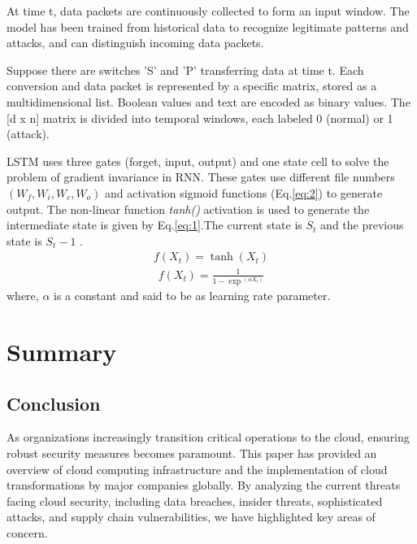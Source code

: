 \documentclass{ijitcs}
\begin{document}
At time t, data packets are continuously collected to form an input window. The model has been trained from historical data to recognize legitimate patterns and attacks, and can distinguish incoming data packets.

Suppose there are switches 'S' and 'P' transferring data at time t. Each conversion and data packet is represented by a specific matrix, stored as a multidimensional list. Boolean values and text are encoded as binary values. The [d x n] matrix is divided into temporal windows, each labeled 0 (normal) or 1 (attack)\cite{priyadarshini2022deep}.

LSTM uses three gates (forget, input, output) and one state cell to solve the problem of gradient invariance in RNN. These gates use different file numbers $(W_f, W_i, W_c, W_o)$ and activation sigmoid functions (Eq.\ref{eq:2}) to generate output. The non-linear function \textit{tanh()} activation is used to generate the intermediate state is given by Eq.\ref{eq:1}.The current state is $S_t$ and the previous state is $S_t - 1$ \cite{priyadarshini2022deep}.
\begin{align}
    f(X_t)= \tanh(X_t)
    \label{eq:1}
\end{align}
\begin{align}
    f(X_t)=\frac{1}{1-\exp{}^(\alpha X_t)}
    \label{eq:2}
\end{align}
where, $\alpha$ is a constant and said to be as learning rate parameter.

\section{Summary}
\subsection{Conclusion}
As organizations increasingly transition critical operations to the cloud, ensuring robust security measures becomes paramount. This paper has provided an overview of cloud computing infrastructure and the implementation of cloud transformations by major companies globally. By analyzing the current threats facing cloud security, including data breaches, insider threats, sophisticated attacks, and supply chain vulnerabilities, we have highlighted key areas of concern.
\end{document}
